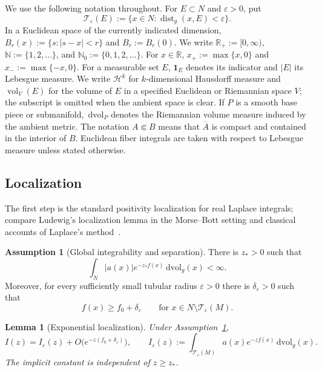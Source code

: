 \documentclass[11pt]{amsart}
\numberwithin{equation}{section}
\newtheorem{lemma}[theorem]{Lemma}
\theoremstyle{definition}
\newtheorem{assumption}[theorem]{Assumption}
\theoremstyle{remark}
\DeclareMathOperator{\dist}{dist}
\newcommand{\R}{\mathbb{R}}
\newcommand{\ind}{\mathbf{1}}
\newcommand{\dvol}{\,\mathrm{dvol}}
\newcommand{\vol}{\operatorname{vol}}
\newcommand{\eps}{\varepsilon}
\newcommand{\cT}{\mathcal{T}}
\begin{document}
We use the following notation throughout.  For $E\subset N$ and $\eps>0$, put
\begin{equation*}
  \cT_\eps(E):=\{x\in N:\dist_g(x,E)<\eps\}.
\end{equation*}
In a Euclidean space of the currently indicated dimension,
$B_r(x):=\{s:|s-x|<r\}$ and $B_r:=B_r(0)$.  We write $\R_+:=[0,\infty)$,
$\mathbb N:=\{1,2,\ldots\}$, and
$\mathbb N_0:=\{0,1,2,\ldots\}$.  For $x\in\R$,
$x_+:=\max\{x,0\}$ and $x_-:=\max\{-x,0\}$.  For a measurable set $E$,
$\ind_E$ denotes its indicator and $|E|$ its Lebesgue measure.  We write
$\mathcal H^k$ for $k$-dimensional Hausdorff measure and
$\vol_V(E)$ for the volume of $E$ in a specified Euclidean or Riemannian
space $V$; the subscript is omitted when the ambient space is clear.  If $P$
is a smooth base piece or submanifold, $\dvol_P$ denotes the Riemannian volume
measure induced by the ambient metric.  The notation $A\Subset B$ means that
$\overline A$ is compact and contained in the interior of $B$.  Euclidean
fiber integrals are taken with respect to Lebesgue measure unless stated
otherwise.

\subsection{Localization}

The first step is the standard positivity localization for real Laplace
integrals; compare Ludewig's localization lemma in the Morse--Bott setting and
classical accounts of Laplace's method~\cite{Ludewig,Wong}.

\begin{assumption}[Global integrability and separation]\label{ass:global}
There is $z_*>0$ such that
\begin{equation}\label{eq:A0}
  \int_N |a(x)|e^{-z_*f(x)}\dvol_g(x)<\infty.
\end{equation}
Moreover, for every sufficiently small tubular radius $\eps>0$ there is
$\delta_\eps>0$ such that
\begin{equation}\label{eq:A1}
  f(x)\ge f_0+\delta_\eps
  \qquad\text{for }x\in N\setminus \cT_\eps(M).
\end{equation}
\end{assumption}

\begin{lemma}[Exponential localization]\label{lem:localization}
Under Assumption~\ref{ass:global},
\begin{equation}\label{eq:localization}
  I(z)=I_\eps(z)+O\bigl(e^{-z(f_0+\delta_\eps)}\bigr),
  \qquad
  I_\eps(z):=\int_{\cT_\eps(M)}a(x)e^{-zf(x)}\dvol_g(x).
\end{equation}
The implicit constant is independent of $z\ge z_*$.
\end{lemma}
\end{document}
